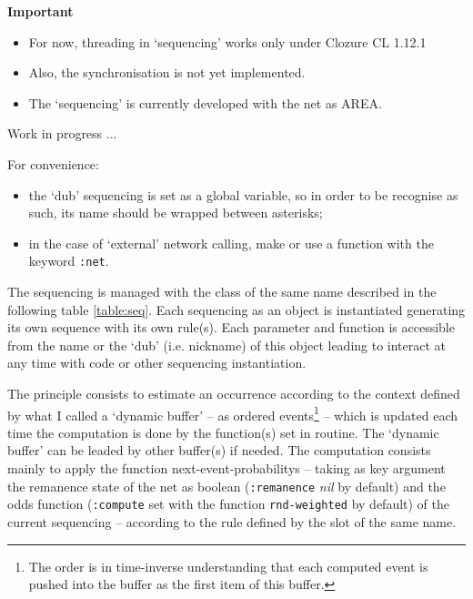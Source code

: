  \begin{notes}

{\large \textbf{Important}}

\begin{itemize}

\item For now, threading in `sequencing' works only under Clozure CL 1.12.1

\item Also, the synchronisation is not yet implemented.

\item The `sequencing'  is currently developed with the net as AREA.
 
\end{itemize}

Work in progress ...

\hrulefill 

For convenience:
\begin{itemize}

\item the `dub' sequencing is set as a global variable, so in order to be recognise as such, its name should be wrapped between asterisks;

\item in the case of `external' network calling, make or use a function with the keyword \texttt{:net}.
 
\end{itemize}

\end{notes}

\bigskip

The sequencing is managed with the class of the same name described in the following table \ref{table:seq}. Each sequencing as an object is instantiated generating its own sequence with its own rule(s). Each parameter and function is accessible from the name or the `dub' (i.e. nickname) of this object leading to interact at any time with code or other sequencing instantiation.

\smallskip

The principle consists to estimate an occurrence according to the context defined by what I called a `dynamic buffer' -- as ordered events\footnote{The order is in time-inverse understanding that each computed event is pushed into the buffer as the first item of this buffer.} -- which is updated each time the computation is done by the function(s) set in routine. The `dynamic buffer' can be leaded by other buffer(s) if needed. The computation consists mainly to apply the function \glspl{next-event-probability} -- taking as key argument the remanence state of the net as boolean (\texttt{:remanence} \textit{nil} by default)  and the odds function (\texttt{:compute} set with the function \texttt{rnd-weighted} by default) of the current sequencing --  according to the rule defined by the slot of the same name. 

